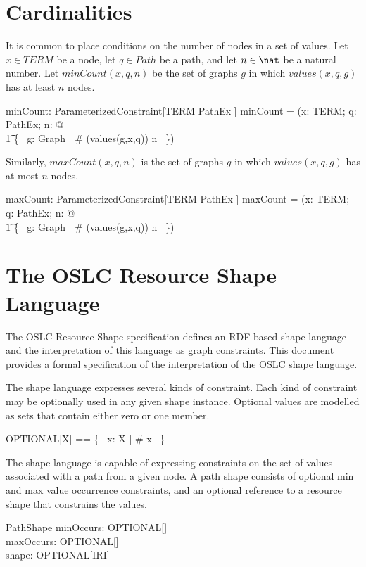 \section{Cardinalities}

It is common to place conditions on the number of nodes in a set of values.
Let $x \in TERM$ be a node, let $q \in Path$ be a path, and let $n \in \nat$ be a natural number.
Let $minCount(x,q,n)$ be the set of graphs $g$ in which $values(x,q,g)$ has at least $n$ nodes.
\begin{axdef}
minCount: ParameterizedConstraint[TERM \cross PathEx \cross \nat]
\where
minCount = (\lambda x: TERM; q: PathEx; n: \nat @ \\
\t1	\{~ g: Graph | \# (values(g,x,q)) \geq n ~\})
\end{axdef}

Similarly, $maxCount(x,q,n)$ is the set of graphs $g$ in which $values(x,q,g)$ has at most $n$ nodes.
\begin{axdef}
maxCount: ParameterizedConstraint[TERM \cross PathEx \cross \nat]
\where
maxCount = (\lambda x: TERM; q: PathEx; n: \nat @ \\
\t1	\{~ g: Graph | \# (values(g,x,q)) \leq n ~\})
\end{axdef}

\section{The OSLC Resource Shape Language}

The OSLC Resource Shape specification defines an RDF-based shape language and the interpretation of this language as graph constraints. This document provides a formal specification of the interpretation of the OSLC shape language.

The shape language expresses several kinds of constraint.
Each kind of constraint may be optionally used in any given shape instance.
Optional values are modelled as sets that contain either zero or one member.
\begin{zed}
OPTIONAL[X] == \{~ x: \finset X | \# x  ~\}
\end{zed}

The shape language is capable of expressing constraints on the
set of values associated with a path from a given node.
A path shape consists of optional min and max value occurrence constraints, and an optional reference to a resource shape that constrains the values.
\begin{schema}{PathShape}
minOccurs: OPTIONAL[\nat] \\
maxOccurs: OPTIONAL[\nat] \\
shape: OPTIONAL[IRI]
\end{schema}


